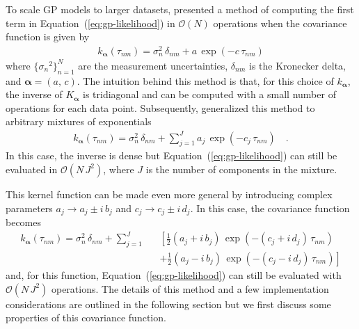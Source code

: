 \documentclass[manuscript, letterpaper]{aastex6}
\renewcommand{\eqref}[1]{\ref{eq:#1}}
\newcommand{\Eq}[1]{Equation~(\eqref{#1})}
\newcommand{\eq}[1]{\Eq{#1}}
\newcommand{\eqlabel}[1]{\label{eq:#1}}
\newcommand{\bvec}[1]{{\ensuremath{\boldsymbol{#1}}}}
\begin{document}
To scale GP models to larger datasets, \citet{Rybicki:1995} presented a method
of computing the first term in \eq{gp-likelihood} in $\mathcal{O}(N)$
operations when the covariance function is given by
\begin{eqnarray}\eqlabel{kernel-simple}
k_\bvec{\alpha}(\tau_{nm}) = \sigma_n^2\,\delta_{nm} + a\,\exp(-c\,\tau_{nm})
\end{eqnarray}
where $\{{\sigma_n}^2\}_{n=1}^N$ are the measurement uncertainties,
$\delta_{nm}$ is the Kronecker delta, and $\bvec{\alpha} = (a,\,c)$.
The intuition behind this method is that, for this choice of $k_\bvec{\alpha}$,
the inverse of $K_\bvec{\alpha}$ is tridiagonal and can be computed
with a small number of operations for each data point.
Subsequently, \citet{Ambikasaran:2015} generalized this method to arbitrary
mixtures of exponentials
\begin{eqnarray}
k_\bvec{\alpha}(\tau_{nm}) = \sigma_n^2\,\delta_{nm} +
    \sum_{j=1}^J a_j\,\exp(-c_j\,\tau_{nm})\quad.
\end{eqnarray}
In this case, the inverse is dense but \eq{gp-likelihood} can still be
evaluated in $\mathcal{O}(N\,J^2)$, where $J$ is the number of components
in the mixture.

This kernel function can be made even more general by
introducing complex parameters $a_j \to a_j\pm i\,b_j$ and
$c_j \to c_j\pm i\,d_j$.
In this case, the covariance function becomes
\begin{eqnarray}\eqlabel{celerite-kernel-complex}
k_\bvec{\alpha}(\tau_{nm}) = \sigma_n^2\,\delta_{nm} +
    \sum_{j=1}^J &&\left[
    \frac{1}{2}(a_j + i\,b_j)\,\exp\left(-(c_j+i\,d_j)\,\tau_{nm}\right)
        \right. \nonumber\\
    &&+\left.
    \frac{1}{2}(a_j - i\,b_j)\,\exp\left(-(c_j-i\,d_j)\,\tau_{nm}\right)
\right]
\end{eqnarray}
and, for this function, \eq{gp-likelihood} can still be evaluated with
$\mathcal{O}(N\,J^2)$ operations.
The details of this method and a few implementation considerations are
outlined in the following section but we first discuss some
properties of this covariance function.
\end{document}

